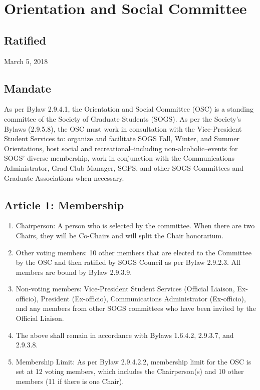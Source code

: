 \section{Orientation and Social Committee}
\subsection{Ratified}
March 5, 2018
\subsection{Mandate}
As per Bylaw 2.9.4.1, the Orientation and Social Committee (OSC) is a standing committee of the Society of Graduate Students (SOGS). As per the Society's Bylaws (2.9.5.8), the OSC must work in consultation with the Vice-President Student Services to: organize and facilitate SOGS Fall, Winter, and Summer Orientations, host social and recreational--including non-alcoholic--events for SOGS' diverse membership, work in conjunction with the Communications Administrator, Grad Club Manager, SGPS, and other SOGS Committees and Graduate Associations when necessary.

\subsection{Article 1: Membership}
\begin{enumerate}[label*=\arabic*., align=left]	
\item Chairperson: A person who is selected by the committee. When there are two Chairs, they will be Co-Chairs and will split the Chair honorarium. 
\item Other voting members: 10 other members that are elected to the Committee by the OSC and then ratified by SOGS Council as per Bylaw 2.9.2.3. All members are bound by Bylaw 2.9.3.9.
\item Non-voting members: Vice-President Student Services (Official Liaison, Ex-officio), President (Ex-officio), Communications Administrator (Ex-officio), and any members from other SOGS committees who have been invited by the Official Liaison.
\item The above shall remain in accordance with Bylaws 1.6.4.2, 2.9.3.7, and 2.9.3.8.
\item Membership Limit: As per Bylaw 2.9.4.2.2, membership limit for the OSC is set at 12 voting members, which includes the Chairperson(s) and 10 other members (11 if there is one Chair).
\end{enumerate}

